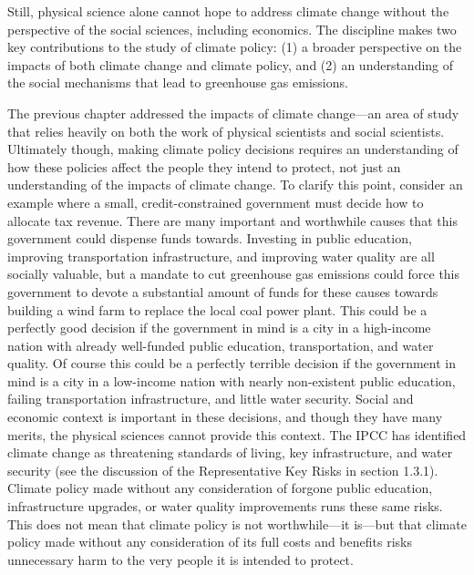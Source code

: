 Still, physical science alone cannot hope to address climate change without the perspective of the social sciences, including economics. The discipline makes two key contributions to the study of climate policy: (1) a broader perspective on the impacts of both climate change and climate policy, and (2) an understanding of the social mechanisms that lead to greenhouse gas emissions. 

The previous chapter addressed the impacts of climate change---an area of study that relies heavily on both the work of physical scientists and social scientists.  Ultimately though, making climate policy decisions requires an understanding of how these policies affect the people they intend to protect, not just an understanding of the impacts of climate change. To clarify this point, consider an example where a small, credit-constrained  government must decide how to allocate tax revenue. There are many important and worthwhile causes that this government could dispense funds towards. Investing in public education, improving transportation infrastructure, and improving water quality are all socially valuable, but a mandate to cut greenhouse gas emissions could force this government to devote a substantial amount of funds for these causes towards building a wind farm to replace the local coal power plant. This could be a perfectly good decision if the government in mind is a city in a high-income nation with already well-funded public education, transportation, and water quality. Of course this could be a perfectly terrible decision if the government in mind is a city in a low-income nation with nearly non-existent public education, failing transportation infrastructure, and little water security. Social and economic context is important in these decisions, and though they have many merits, the physical sciences cannot provide this context. The IPCC has identified climate change as threatening standards of living, key infrastructure, and water security (see the discussion of the Representative Key Risks in section 1.3.1). Climate policy made without any consideration of forgone public education, infrastructure upgrades, or water quality improvements runs these same risks. This does not mean that  climate policy is not worthwhile---it is---but that climate policy made without any consideration of its full costs and benefits risks unnecessary harm to the very people it is intended to protect. 

